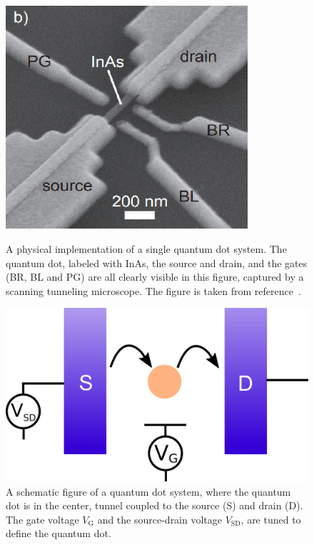 \documentclass[../main.tex]{subfiles}
\begin{document}
\begin{figure}[H]
    \centering
    \begin{minipage}[t]{0.45\textwidth}
        \centering
        \includegraphics[width=0.8\textwidth]{figures/qdotsem.png}
        \caption{A physical implementation of a single quantum dot system. The quantum dot, labeled with InAs, the source and drain, and the gates (BR, BL and PG) are all clearly visible in this figure, captured by a scanning tunneling microscope. The figure is taken from reference~\cite{sven}.}
    \label{fig:sem}
    \end{minipage}\hfill
    \begin{minipage}[t]{0.45\textwidth}
        \centering
        \includegraphics[width=\textwidth]{figures/qdotschematic.png}
        \caption{A schematic figure of a quantum dot system, where the quantum dot is in the center, tunnel coupled to the source (S) and drain (D). The gate voltage $V_\text{G}$ and the source-drain voltage $V_\text{SD}$, are tuned to define the quantum dot.}
    \label{fig:qdotscheme}
    \end{minipage}\hfill
\end{figure}
\end{document}
